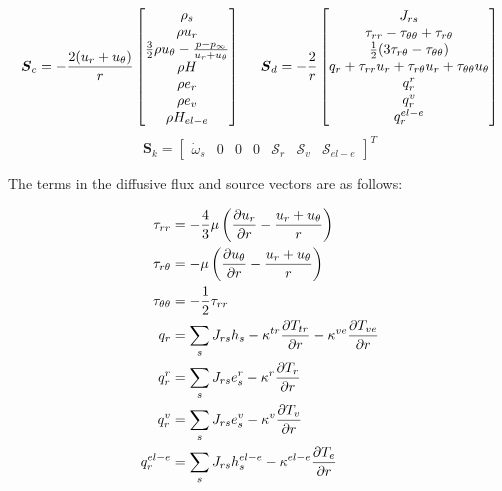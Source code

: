\documentclass[10pt]{article}
\begin{document}
\begin{flushleft}
\begin{equation}
    \boldsymbol{S}_c = -\frac{2(u_r + u_\theta)}{r}
        \begin{bmatrix}
        \rho_s \\  
        \rho u_r \\ 
        \frac{3}{2} \rho u_\theta - \frac{p-p_\infty}{u_r + u_\theta} \\ 
        \rho H \\ 
        \rho e_r \\
        \rho e_{v} \\
        \rho H_{el-e}
        \end{bmatrix}
    \hspace{5mm}
    \boldsymbol{S}_d = -\frac{2}{r}
        \begin{bmatrix}
        J_{rs} \\ 
        \tau_{rr} - \tau_{\theta \theta} + \tau_{r \theta} \\ 
        \frac{1}{2} (3\tau_{r \theta} - \tau_{\theta \theta}) \\ 
        q_r + \tau_{rr} u_r + \tau_{r \theta} u_r + \tau_{\theta \theta} u_\theta \\
        q_r^r \\
        q_r^v \\
        q_r^{el-e}
        \end{bmatrix}
\end{equation}
\begin{equation}
    \boldsymbol{S}_k =
        \begin{bmatrix}
        \dot{\omega}_s & 0 & 0 & 0 & \mathcal{S}_r & \mathcal{S}_v & \mathcal{S}_{el-e}
        \end{bmatrix}^T
\end{equation}

The terms in the diffusive flux and source vectors are as follows:

\begin{align*}
    \tau_{rr} &= -\frac{4}{3}\mu \left( \frac{\partial u_r}{\partial r} - \frac{u_r + u_\theta}{r} \right)
    \\ \tau_{r\theta} &= -\mu \left( \frac{\partial u_\theta}{\partial r} - \frac{u_r + u_\theta}{r} \right)
    \\ \tau_{\theta\theta} &= -\frac{1}{2} \tau_{rr}
    \\ q_r &= \sum_s J_{rs} h_s - \kappa^{tr}\frac{\partial T_{tr}}{\partial r} - \kappa^{ve} \frac{\partial T_{ve}}{\partial r}
    \\ q_r^{r} &= \sum_s J_{rs} e_s^{r} - \kappa^{r} \frac{\partial T_{r}}{\partial r}
    \\ q_r^{v} &= \sum_s J_{rs} e_s^{v} - \kappa^{v} \frac{\partial T_{v}}{\partial r}
    \\ q_r^{el-e} &= \sum_s J_{rs} h_s^{el-e} - \kappa^{el-e} \frac{\partial T_{e}}{\partial r}
\end{align*}


\end{flushleft}
\end{document}
